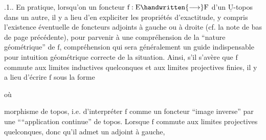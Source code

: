 .1.. En pratique, lorsqu'on un foncteur $\mathrm{f}:\mathrm{E}\handwritten{\longrightarrow}\mathrm{F}$ d'un $\underline{\mathrm{U}}$-topos dans un autre, il y a lieu d'en expliciter  les propriétés d'exactitude,  y compris l'existence éventuelle de foncteurs adjoints à gauche ou à droite (cf. la note de bas de page précédente), pour parvenir à une compréhension de la ``nature géométrique'' de $\mathrm{f}$,  compréhension qui sera généralement un guide indispensable pour intuition géométrique correcte de la situation. Ainsi, s'il s'avère que $\mathrm{f}$ commute aux limites inductives quelconques et aux limites projectives finies, il y a lieu d'écrire $\mathrm{f}$ sous la forme
où
morphisme de topos, i.e. d'interpréter $\mathrm{f}$ comme un foncteur ``image inverse'' par une ````application continue'' de topos. Lorsque $\mathrm{f}$ commute aux limites projectives quelconques, donc qu'il admet un adjoint à gauche,
